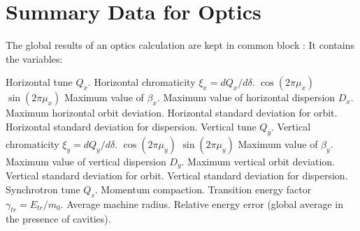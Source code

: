 \section{Summary Data for Optics}
\label{Ssumm}
The global results of an optics calculation are kept in common block
:
It contains the variables:
\begin{mylist}
Horizontal tune $Q_x$.
Horizontal chromaticity $\xi_x = d Q_x / d \delta$.
$\cos (2 \pi \mu_x)$
$\sin (2 \pi \mu_x)$
Maximum value of $\beta_x$.
Maximum value of horizontal dispersion $D_x$.
Maximum horizontal orbit deviation.
Horizontal standard deviation for orbit.
Horizontal standard deviation for dispersion.
Vertical tune $Q_y$.
Vertical chromaticity $\xi_y = d Q_y / d \delta$.
$\cos (2 \pi \mu_y)$
$\sin (2 \pi \mu_y)$
Maximum value of $\beta_y$.
Maximum value of vertical dispersion $D_y$.
Maximum vertical orbit deviation.
Vertical standard deviation for orbit.
Vertical standard deviation for dispersion.
Synchrotron tune $Q_s$.
Momentum compaction.
Transition energy factor $\gamma_{tr} = E_{tr} / m_0$.
Average machine radius.
Relative energy error (global average in the presence of cavities).
\end{mylist}
 
